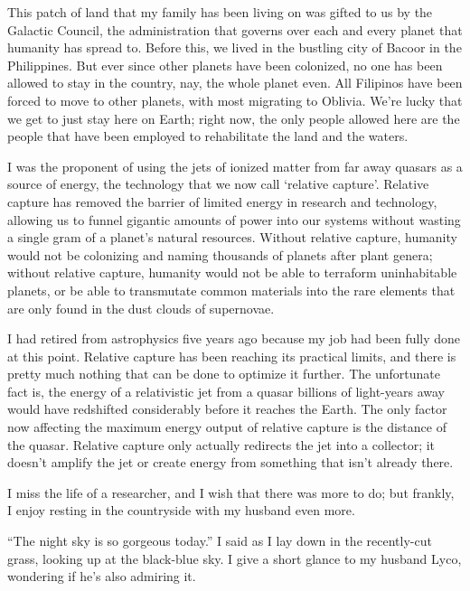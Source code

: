 \documentclass{book}
\begin{document}
			This patch of land that my family has been living on was gifted to us by the Galactic
			Council, the administration that governs over each and every planet that humanity has
			spread to. Before this, we lived in the bustling city of Bacoor in the Philippines. But
			ever since other planets have been colonized, no one has been allowed to stay in the country,
			nay, the whole planet even. All Filipinos have been forced to move to other planets, with
			most migrating to Oblivia. We're lucky that we get to just stay here on Earth; right now,
			the only people allowed here are the people that have been employed to rehabilitate the land and the waters.

			I was the proponent of using the jets of ionized matter from far away quasars as
			a source of energy, the technology that we now call `relative capture'. Relative
			capture has removed the barrier of limited energy in research and technology, allowing us to
			funnel gigantic amounts of power into our systems without wasting a single
			gram of a planet's natural resources. Without relative capture, humanity would not be
			colonizing and naming thousands of planets after plant genera; without relative
			capture, humanity would not be able to terraform uninhabitable planets, or be able to
			transmutate common materials into the rare elements that are only found in the dust clouds of
			supernovae.

			I had retired from astrophysics five years ago because my job had been fully done at this
			point. Relative capture has been reaching its practical limits, and there is pretty
			much nothing that can be done to optimize it further. The unfortunate fact is, the energy
			of a relativistic jet from a quasar billions of light-years away would have redshifted considerably before it
			reaches the Earth. The only factor now affecting the maximum energy output of relative capture
			is the distance of the quasar. Relative capture only actually redirects the jet into a collector;
			it doesn't amplify the jet or create energy from something that isn't already there.

			I miss the life of a researcher, and I wish that there was more to do; but frankly, I
			enjoy resting in the countryside with my husband even more.

			``The night sky is so gorgeous today.'' I said as I lay down in the recently-cut grass,
			looking up at the black-blue sky. I give a short glance to my husband Lyco, wondering
			if he's also admiring it.
\end{document}
